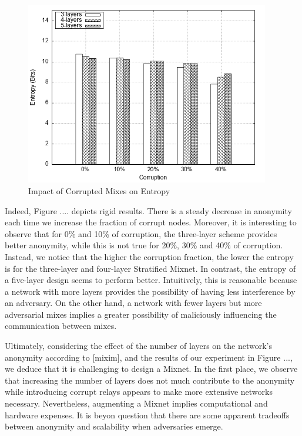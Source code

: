 \documentclass[logo,msc,cyber]{infthesis}   %
\begin{document}
\begin{figure}[h!]
    \centering
    \includegraphics[height=8cm]{figures/mixim/4.png}
    \caption{Impact of Corrupted Mixes on Entropy}
    \label{fig:corrupted-mixes}
 \end{figure}

Indeed, Figure .... depicts rigid results. There is a steady decrease in
anonymity each time we increase the fraction of corrupt nodes. Moreover, it is
interesting to observe that for 0\% and 10\% of corruption, the three-layer scheme
provides better anonymity, while this is not true for 20\%, 30\% and 40\% of
corruption. Instead, we notice that the higher the corruption fraction, the
lower the entropy is for the three-layer and four-layer Stratified Mixnet. In
contrast, the entropy of a five-layer design seems to perform better.
Intuitively, this is reasonable because a network with more layers provides the
possibility of having less interference by an adversary. On the other hand, a
network with fewer layers but more adversarial mixes implies a greater
possibility of maliciously influencing the communication between mixes.

Ultimately, considering the effect of the number of layers on the network's
anonymity according to [mixim], and the results of our experiment in Figure ...,
we deduce that it is challenging to design a Mixnet. In the first place, we
observe that increasing the number of layers does not much contribute to the
anonymity while introducing corrupt relays appears to make more extensive
networks necessary. Nevertheless, augmenting a Mixnet implies computational and
hardware expenses. It is beyon question that there are some apparent tradeoffs
between anonymity and scalability when adversaries emerge.
\end{document}

